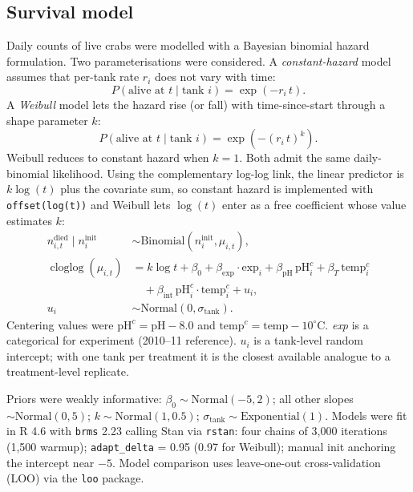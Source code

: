 \documentclass[11pt]{article}
\begin{document}
\subsection{Survival model}
\label{sec:surv_model}
Daily counts of live crabs were modelled with a Bayesian binomial hazard formulation. Two parameterisations were considered. A \emph{constant-hazard} model assumes that per-tank rate $r_i$ does not vary with time:
\begin{equation}
P(\text{alive at } t \mid \text{tank } i) = \exp(-r_i \, t).
\end{equation}
A \emph{Weibull} model lets the hazard rise (or fall) with time-since-start through a shape parameter $k$:
\begin{equation}
P(\text{alive at } t \mid \text{tank } i) = \exp\!\left(-(r_i \, t)^k\right).
\end{equation}
Weibull reduces to constant hazard when $k = 1$. Both admit the same daily-binomial likelihood. Using the complementary log-log link, the linear predictor is $k \log(t)$ plus the covariate sum, so constant hazard is implemented with \texttt{offset(log(t))} and Weibull lets $\log(t)$ enter as a free coefficient whose value estimates $k$:
\begin{align}
n^{\text{died}}_{i,t} \mid n^{\text{init}}_i &\sim \text{Binomial}\!\left(n^{\text{init}}_i, \mu_{i,t}\right), \\
\operatorname{cloglog}(\mu_{i,t}) &= k\log t + \beta_0 + \beta_{\text{exp}} \cdot \text{exp}_i + \beta_{\text{pH}}\,\text{pH}^c_i + \beta_T\,\text{temp}^c_i \nonumber\\
&\quad + \beta_{\text{int}}\,\text{pH}^c_i \cdot \text{temp}^c_i + u_i,\\
u_i &\sim \text{Normal}(0, \sigma_{\text{tank}}).
\end{align}
Centering values were $\text{pH}^c = \text{pH} - 8.0$ and $\text{temp}^c = \text{temp} - 10^\circ$C. \textit{exp} is a categorical for experiment (2010--11 reference). $u_i$ is a tank-level random intercept; with one tank per treatment it is the closest available analogue to a treatment-level replicate.

Priors were weakly informative: $\beta_0 \sim \text{Normal}(-5, 2)$; all other slopes $\sim \text{Normal}(0, 5)$; $k \sim \text{Normal}(1, 0.5)$; $\sigma_{\text{tank}} \sim \text{Exponential}(1)$. Models were fit in R 4.6 with \texttt{brms} 2.23 calling Stan via \texttt{rstan}: four chains of 3{,}000 iterations (1{,}500 warmup); \texttt{adapt\_delta} = 0.95 (0.97 for Weibull); manual init anchoring the intercept near $-5$. Model comparison uses leave-one-out cross-validation (LOO) via the \texttt{loo} package.
\end{document}
